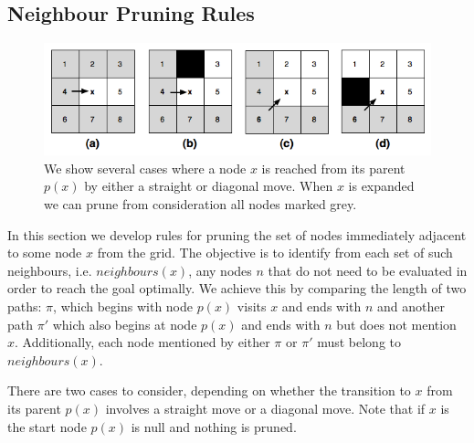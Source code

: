 \subsection{Neighbour Pruning Rules} 
\label{sec:pruning}

\begin{figure}[tb]
       \begin{center}
		   \includegraphics[scale=0.4, trim = 10mm 10mm 10mm 0mm]
			{diagrams/pruningrules.png}
       \end{center}
	\vspace{-3pt}
       \caption{We show several cases where a node $x$ is reached from its
parent $p(x)$ by either a straight or diagonal move. When $x$ is expanded we can
prune from consideration all nodes marked grey.}
       \label{fig:pruning}
\end{figure}

In this section we develop rules for pruning the set of nodes immediately 
adjacent to some node $x$ from the grid.
The objective is to identify from each
set of such neighbours, i.e. $neighbours(x)$, any nodes $n$ that do not need to be evaluated in order to
reach the goal optimally. We achieve this by comparing the length of two paths:
$\pi$, which begins with node $p(x)$ visits $x$ and ends with $n$ and another
path $\pi'$ which also begins at node $p(x)$ and ends with $n$ but does not 
mention $x$. 
Additionally, each node mentioned by either $\pi$ or $\pi'$ must belong to 
$neighbours(x)$. 

There are two cases to consider, depending on
whether the transition to $x$ from its parent $p(x)$ involves a straight move or
a diagonal move. Note that if $x$ is the start node $p(x)$ is null and nothing
is pruned.


